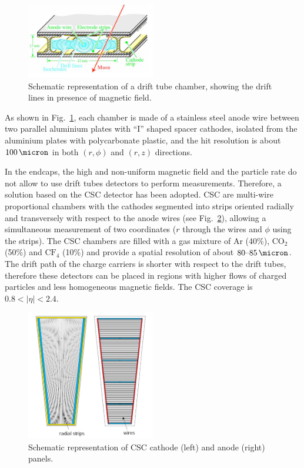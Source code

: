 \begin{figure}[htb]
\centering
\includegraphics[width=0.5\textwidth]{images/drifttube.png}
\caption{Schematic representation of a drift tube chamber, showing the drift lines in presence of magnetic field.}\label{fig:dt}
\end{figure}
As shown in Fig.~\ref{fig:dt}, each chamber is made of a stainless steel anode wire between two parallel aluminium plates with ``I'' shaped spacer cathodes, isolated from the aluminium plates with polycarbonate plastic, and the hit resolution is about $100\,\micron$ in both $(r,\phi)$ and $(r,z)$ directions.

In the endcaps, the high and non-uniform magnetic field and the particle rate do not allow to use drift tubes detectors to perform measurements. Therefore, a solution based on the CSC detector has been adopted. CSC are multi-wire proportional chambers with the cathodes segmented into strips oriented radially and transversely with respect to the anode wires (see Fig.~\ref{fig:csc}), allowing a simultaneous measurement of two coordinates ($r$ through the wires and $\phi$ using the strips). The CSC chambers are filled with a gas mixture of Ar (40\%), $\mathrm{CO_2}$ (50\%) and $\mathrm{CF_4}$ (10\%) and provide a spatial resolution of about $80\mbox{--}85\,\micron$.
The drift path of the charge carriers is shorter with respect to the drift tubes, therefore these detectors can be placed in regions with higher flows of charged particles and less homogeneous magnetic fields. The CSC coverage is $0.8 < |\eta| < 2.4$.
\begin{figure}[htb]
\centering
\includegraphics[width=0.5\textwidth]{images/csc.png}
\caption{Schematic representation of CSC cathode (left) and anode (right) panels.}\label{fig:csc}
\end{figure}

